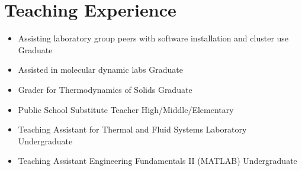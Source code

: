 \section{Teaching Experience}

\begin{itemize}
    \item Assisting laboratory group peers with software installation and cluster use \hfill Graduate
    \item Assisted in molecular dynamic labs \hfill Graduate
    \item Grader for Thermodynamics of Solids \hfill Graduate
    \item Public School Substitute Teacher \hfill High/Middle/Elementary
    \item Teaching Assistant for Thermal and Fluid Systems Laboratory \hfill Undergraduate
    \item Teaching Assistant Engineering Fundamentals II (MATLAB) \hfill Undergraduate
\end{itemize}
